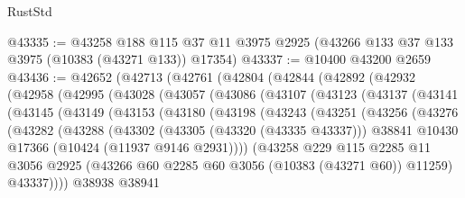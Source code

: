 \begin{lexlean}{RustStd}
\begin{coremodule}
@43335 := @43258
    @188
    @115
    @37
    @11
    @3975
    @2925
    (@43266 @133 @37 @133 @3975 (@10383 (@43271 @133)) @17354)
@43337 := @10400 @43200 @2659
@43436 := @42652
    (@42713
      (@42761
        (@42804
          (@42844
            (@42892
              (@42932
                (@42958
                  (@42995
                    (@43028
                      (@43057
                        (@43086
                          (@43107
                            (@43123
                              (@43137
                                (@43141
                                  (@43145
                                    (@43149
                                      (@43153
                                        (@43180
                                          (@43198
                                            (@43243
                                              (@43251
                                                (@43256
                                                  (@43276
                                                    (@43282
                                                      (@43288
                                                        (@43302
                                                          (@43305 (@43320 (@43335 @43337)))
                                                          @38841
                                                          @10430
                                                          @17366
                                                          (@10424 (@11937 @9146 @2931))))
                                                      (@43258
                                                        @229
                                                        @115
                                                        @2285
                                                        @11
                                                        @3056
                                                        @2925
                                                        (@43266
                                                          @60
                                                          @2285
                                                          @60
                                                          @3056
                                                          (@10383 (@43271 @60))
                                                          @11259)
                                                        @43337))))
                                                @38938
                                                @38941

\end{coremodule}
\end{lexlean}
